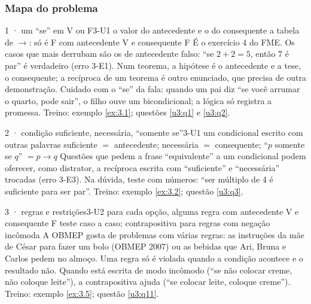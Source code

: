 \subsubsection{Mapa do problema}

\begin{caso}{1 · um \enquote{se} em V ou F}{3-U1}
{o valor do antecedente e o do consequente}
{a tabela de $\rightarrow$: só é F com antecedente V e consequente F}
\reconhecer É o exercício 4 do FME. Os casos que mais derrubam são os de antecedente falso: \enquote{se $2+2=5$, então $7$ é par} é verdadeiro (erro 3-E1). Num teorema, a hipótese é o antecedente e a tese, o consequente; a recíproca de um teorema é outro enunciado, que precisa de outra demonstração. Cuidado com o \enquote{se} da fala: quando um pai diz \enquote{se você arrumar o quarto, pode sair}, o filho ouve um bicondicional; a lógica só registra a promessa. Treino: exemplo \ref{ex:3.1}; questões \ref{u3:q1} e \ref{u3:q2}.
\end{caso}

\begin{caso}{2 · condição suficiente, necessária, \enquote{somente se}}{3-U1}
{um condicional escrito com outras palavras}
{suficiente $=$ antecedente; necessária $=$ consequente; \enquote{$p$ somente se $q$} $= p\rightarrow q$}
\reconhecer Questões que pedem a frase \enquote{equivalente} a um condicional podem oferecer, como distrator, a recíproca escrita com \enquote{suficiente} e \enquote{necessária} trocadas (erro 3-E3). Na dúvida, teste com números: \enquote{ser múltiplo de 4 é suficiente para ser par}. Treino: exemplo \ref{ex:3.2}; questão \ref{u3:q3}.
\end{caso}

\begin{caso}{3 · regras e restrições}{3-U2}
{para cada opção, alguma regra com antecedente V e consequente F}
{teste caso a caso; contrapositiva para regras com negação incômoda}
\reconhecer A OBMEP gosta de problemas com várias regras: as instruções da mãe de César para fazer um bolo (OBMEP 2007) ou as bebidas que Ari, Bruna e Carlos pedem no almoço. Uma regra só é violada quando a condição acontece e o resultado não. Quando está escrita de modo incômodo (\enquote{se não colocar creme, não coloque leite}), a contrapositiva ajuda (\enquote{se colocar leite, coloque creme}). Treino: exemplo \ref{ex:3.5}; questão \ref{u3:q11}.
\end{caso}

